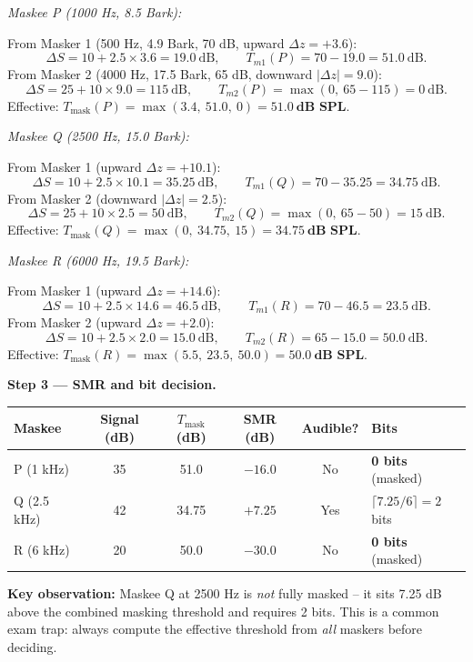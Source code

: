 \begin{examplebox}
\medskip
\noindent\textit{Maskee P (1000 Hz, 8.5 Bark):}

From Masker 1 (500 Hz, 4.9 Bark, 70 dB, upward $\Delta z = +3.6$):
\[
\Delta S = 10 + 2.5\times3.6 = 19.0\ \text{dB}, \qquad T_{m1}(P) = 70 - 19.0 = 51.0\ \text{dB}.
\]
From Masker 2 (4000 Hz, 17.5 Bark, 65 dB, downward $|\Delta z| = 9.0$):
\[
\Delta S = 25 + 10\times9.0 = 115\ \text{dB}, \qquad T_{m2}(P) = \max(0,\ 65 - 115) = 0\ \text{dB}.
\]
Effective: $T_{\text{mask}}(P) = \max(3.4,\ 51.0,\ 0) = \mathbf{51.0\ \text{dB SPL}}$.

\medskip
\noindent\textit{Maskee Q (2500 Hz, 15.0 Bark):}

From Masker 1 (upward $\Delta z = +10.1$):
\[
\Delta S = 10 + 2.5\times10.1 = 35.25\ \text{dB}, \qquad T_{m1}(Q) = 70 - 35.25 = 34.75\ \text{dB}.
\]
From Masker 2 (downward $|\Delta z| = 2.5$):
\[
\Delta S = 25 + 10\times2.5 = 50\ \text{dB}, \qquad T_{m2}(Q) = \max(0,\ 65 - 50) = 15\ \text{dB}.
\]
Effective: $T_{\text{mask}}(Q) = \max(0,\ 34.75,\ 15) = \mathbf{34.75\ \text{dB SPL}}$.

\medskip
\noindent\textit{Maskee R (6000 Hz, 19.5 Bark):}

From Masker 1 (upward $\Delta z = +14.6$):
\[
\Delta S = 10 + 2.5\times14.6 = 46.5\ \text{dB}, \qquad T_{m1}(R) = 70 - 46.5 = 23.5\ \text{dB}.
\]
From Masker 2 (upward $\Delta z = +2.0$):
\[
\Delta S = 10 + 2.5\times2.0 = 15.0\ \text{dB}, \qquad T_{m2}(R) = 65 - 15.0 = 50.0\ \text{dB}.
\]
Effective: $T_{\text{mask}}(R) = \max(5.5,\ 23.5,\ 50.0) = \mathbf{50.0\ \text{dB SPL}}$.

\medskip
\noindent\textbf{Step 3 --- SMR and bit decision.}

\begin{center}
\renewcommand{\arraystretch}{1.3}
\begin{tabular}{lccccl}
\toprule
Maskee & Signal (dB) & $T_{\text{mask}}$ (dB) & SMR (dB) & Audible? & Bits \\
\midrule
P (1 kHz)    & 35 & 51.0 & $-16.0$ & No  & \textbf{0 bits} (masked) \\
Q (2.5 kHz)  & 42 & 34.75 & $+7.25$ & Yes & $\lceil 7.25/6 \rceil = 2$ bits \\
R (6 kHz)    & 20 & 50.0 & $-30.0$ & No  & \textbf{0 bits} (masked) \\
\bottomrule
\end{tabular}
\end{center}

\medskip
\noindent\textbf{Key observation:} Maskee Q at 2500 Hz is \emph{not} fully masked -- it sits 7.25 dB above the combined masking threshold and requires 2 bits. This is a common exam trap: always compute the effective threshold from \emph{all} maskers before deciding.
\end{examplebox}

